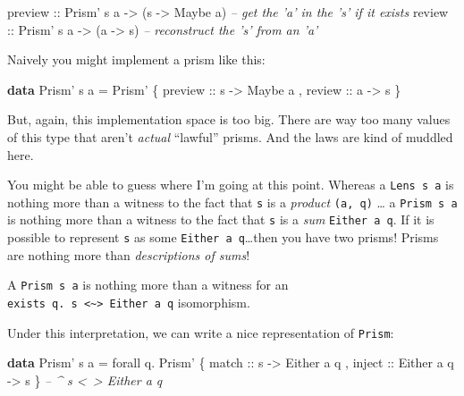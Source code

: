 \documentclass[]{article}
\newenvironment{Shaded}{}{}
\newcommand{\CommentTok}[1]{\textcolor[rgb]{0.38,0.63,0.69}{\textit{#1}}}
\newcommand{\DataTypeTok}[1]{\textcolor[rgb]{0.56,0.13,0.00}{#1}}
\newcommand{\FunctionTok}[1]{\textcolor[rgb]{0.02,0.16,0.49}{#1}}
\newcommand{\KeywordTok}[1]{\textcolor[rgb]{0.00,0.44,0.13}{\textbf{#1}}}
\newcommand{\NormalTok}[1]{#1}
\newcommand{\OtherTok}[1]{\textcolor[rgb]{0.00,0.44,0.13}{#1}}
\begin{document}
\begin{Shaded}
\begin{Highlighting}[]
\OtherTok{preview ::} \DataTypeTok{Prism'}\NormalTok{ s a }\OtherTok{->}\NormalTok{ (s }\OtherTok{->} \DataTypeTok{Maybe}\NormalTok{ a)   }\CommentTok{-- get the 'a' in the 's' if it exists}
\OtherTok{review  ::} \DataTypeTok{Prism'}\NormalTok{ s a }\OtherTok{->}\NormalTok{ (a }\OtherTok{->}\NormalTok{ s)         }\CommentTok{-- reconstruct the 's' from an 'a'}
\end{Highlighting}
\end{Shaded}

Naively you might implement a prism like this:

\begin{Shaded}
\begin{Highlighting}[]
\KeywordTok{data} \DataTypeTok{Prism'}\NormalTok{ s a }\FunctionTok{=} \DataTypeTok{Prism'}\NormalTok{ \{}\OtherTok{ preview ::}\NormalTok{ s }\OtherTok{->} \DataTypeTok{Maybe}\NormalTok{ a}
\NormalTok{                         ,}\OtherTok{ review  ::}\NormalTok{ a }\OtherTok{->}\NormalTok{ s}
\NormalTok{                         \}}
\end{Highlighting}
\end{Shaded}

But, again, this implementation space is too big. There are way too many values
of this type that aren't \emph{actual} ``lawful'' prisms. And the laws are kind
of muddled here.

You might be able to guess where I'm going at this point. Whereas a
\texttt{Lens\textquotesingle{}\ s\ a} is nothing more than a witness to the fact
that \texttt{s} is a \emph{product} \texttt{(a,\ q)} \ldots{} a
\texttt{Prism\textquotesingle{}\ s\ a} is nothing more than a witness to the
fact that \texttt{s} is a \emph{sum} \texttt{Either\ a\ q}. If it is possible to
represent \texttt{s} as some \texttt{Either\ a\ q}\ldots{}then you have two
prisms! Prisms are nothing more than \emph{descriptions of sums}!

A \texttt{Prism\textquotesingle{}\ s\ a} is nothing more than a witness for an
\texttt{exists\ q.\ s\ \textless{}\textasciitilde{}\textgreater{}\ Either\ a\ q}
isomorphism.

Under this interpretation, we can write a nice representation of
\texttt{Prism\textquotesingle{}}:

\begin{Shaded}
\begin{Highlighting}[]
\KeywordTok{data} \DataTypeTok{Prism'}\NormalTok{ s a }\FunctionTok{=}\NormalTok{ forall q}\FunctionTok{.}
                  \DataTypeTok{Prism'}\NormalTok{ \{}\OtherTok{ match  ::}\NormalTok{ s }\OtherTok{->} \DataTypeTok{Either}\NormalTok{ a q}
\NormalTok{                         ,}\OtherTok{ inject ::} \DataTypeTok{Either}\NormalTok{ a q }\OtherTok{->}\NormalTok{ s}
\NormalTok{                         \}    }\CommentTok{-- ^ s <~> Either a q}
\end{Highlighting}
\end{Shaded}
\end{document}
